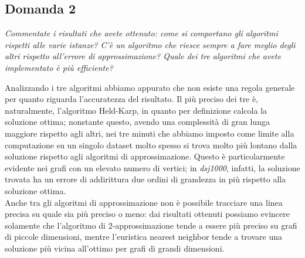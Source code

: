\subsection{Domanda 2}
\textit{Commentate i risultati che avete ottenuto: come si comportano gli algoritmi rispetti alle varie istanze?
C'è un algoritmo che riesce sempre a fare meglio degli altri rispetto all'errore di approssimazione? Quale dei tre
algoritmi che avete implementato è più efficiente?}

Analizzando i tre algoritmi abbiamo appurato che non esiste una regola generale per quanto riguarda l'accuratezza del risultato. Il più preciso dei tre è, naturalmente, l'algoritmo Held-Karp, in quanto per definizione calcola la soluzione ottima; nonstante questo, avendo una complessità di gran lunga maggiore rispetto agli altri, nei tre minuti che abbiamo imposto come limite alla computazione su un singolo dataset molto spesso si trova molto più lontano dalla soluzione rispetto agli algoritmi di approssimazione. Questo è particolarmente evidente nei grafi con un elevato numero di vertici; in \textit{dsj1000}, infatti, la soluzione trovata ha un errore di addirittura due ordini di grandezza in più rispetto alla soluzione ottima. \\
Anche tra gli algoritmi di approssimazione non è possibile tracciare una linea precisa su quale sia più preciso o meno: dai risultati ottenuti possiamo evincere solamente che l'algoritmo di 2-approssimazione tende a essere più preciso su grafi di piccole dimensioni, mentre l'euristica nearest neighbor tende a trovare una soluzione più vicina all'ottimo per grafi di grandi dimensioni. 